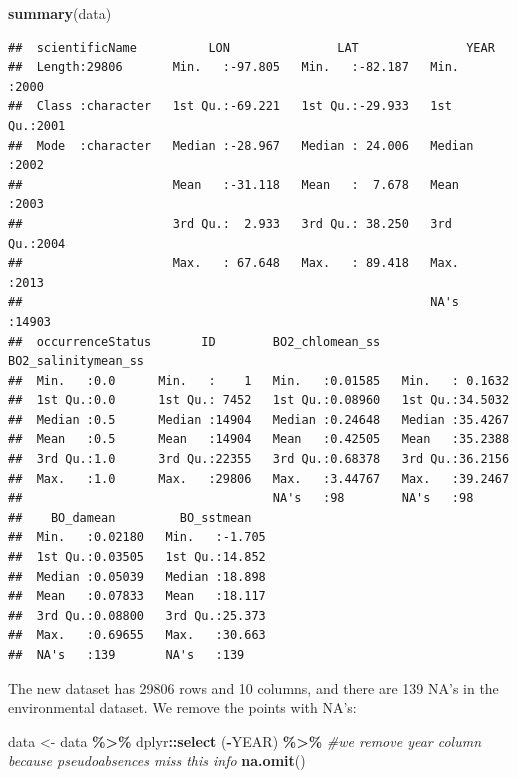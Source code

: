 \documentclass[
]{book}
\newenvironment{Shaded}{\begin{snugshade}}{\end{snugshade}}
\newcommand{\CommentTok}[1]{\textcolor[rgb]{0.56,0.35,0.01}{\textit{#1}}}
\newcommand{\FunctionTok}[1]{\textcolor[rgb]{0.13,0.29,0.53}{\textbf{#1}}}
\newcommand{\NormalTok}[1]{#1}
\newcommand{\OtherTok}[1]{\textcolor[rgb]{0.56,0.35,0.01}{#1}}
\newcommand{\SpecialCharTok}[1]{\textcolor[rgb]{0.81,0.36,0.00}{\textbf{#1}}}
\begin{document}
\begin{Shaded}
\begin{Highlighting}[]
\FunctionTok{summary}\NormalTok{(data)}
\end{Highlighting}
\end{Shaded}

\begin{verbatim}
##  scientificName          LON               LAT               YEAR      
##  Length:29806       Min.   :-97.805   Min.   :-82.187   Min.   :2000   
##  Class :character   1st Qu.:-69.221   1st Qu.:-29.933   1st Qu.:2001   
##  Mode  :character   Median :-28.967   Median : 24.006   Median :2002   
##                     Mean   :-31.118   Mean   :  7.678   Mean   :2003   
##                     3rd Qu.:  2.933   3rd Qu.: 38.250   3rd Qu.:2004   
##                     Max.   : 67.648   Max.   : 89.418   Max.   :2013   
##                                                         NA's   :14903  
##  occurrenceStatus       ID        BO2_chlomean_ss   BO2_salinitymean_ss
##  Min.   :0.0      Min.   :    1   Min.   :0.01585   Min.   : 0.1632    
##  1st Qu.:0.0      1st Qu.: 7452   1st Qu.:0.08960   1st Qu.:34.5032    
##  Median :0.5      Median :14904   Median :0.24648   Median :35.4267    
##  Mean   :0.5      Mean   :14904   Mean   :0.42505   Mean   :35.2388    
##  3rd Qu.:1.0      3rd Qu.:22355   3rd Qu.:0.68378   3rd Qu.:36.2156    
##  Max.   :1.0      Max.   :29806   Max.   :3.44767   Max.   :39.2467    
##                                   NA's   :98        NA's   :98         
##    BO_damean         BO_sstmean    
##  Min.   :0.02180   Min.   :-1.705  
##  1st Qu.:0.03505   1st Qu.:14.852  
##  Median :0.05039   Median :18.898  
##  Mean   :0.07833   Mean   :18.117  
##  3rd Qu.:0.08800   3rd Qu.:25.373  
##  Max.   :0.69655   Max.   :30.663  
##  NA's   :139       NA's   :139
\end{verbatim}

The new dataset has 29806 rows and 10 columns, and there are 139 NA's in the environmental dataset. We remove the points with NA's:

\begin{Shaded}
\begin{Highlighting}[]
\NormalTok{data }\OtherTok{\textless{}{-}}\NormalTok{ data }\SpecialCharTok{\%\textgreater{}\%} 
\NormalTok{  dplyr}\SpecialCharTok{::}\FunctionTok{select}\NormalTok{ (}\SpecialCharTok{{-}}\NormalTok{YEAR) }\SpecialCharTok{\%\textgreater{}\%} \CommentTok{\#we remove year column because pseudoabsences miss this info}
  \FunctionTok{na.omit}\NormalTok{()}
\end{Highlighting}
\end{Shaded}
\end{document}
